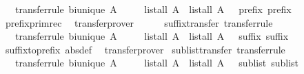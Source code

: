 \begin{isabellebody}
\ \ \ {\isacharbrackleft}transfer{\isacharunderscore}rule{\isacharbrackright}{\isacharcolon}\ {\isachardoublequoteopen}bi{\isacharunderscore}unique\ A{\isachardoublequoteclose}\isanewline
\ \ \ \ \ {\isachardoublequoteopen}{\isacharparenleft}list{\isacharunderscore}all{}\ A\ {\isacharequal}{\isacharequal}{\isacharequal}{\isachargreater}\ list{\isacharunderscore}all{}\ A\ {\isacharequal}{\isacharequal}{\isacharequal}{\isachargreater}\ {\isacharparenleft}{\isacharequal}{\isacharparenright}{\isacharparenright}\ prefix\ prefix{\isachardoublequoteclose}\ \ \isanewline
%
\isadelimproof
\ \ %
\endisadelimproof
%
\isatagproof
{}\isamarkupfalse%
\ prefix{\isacharunderscore}primrec\ \isamarkupfalse%
\ transfer{\isacharunderscore}prover%
\endisatagproof
{\isafoldproof}%
%
\isadelimproof
\isanewline
%
\endisadelimproof
\ \ \ \ \isanewline
{}\isamarkupfalse%
\ suffix{\isacharunderscore}transfer\ {\isacharbrackleft}transfer{\isacharunderscore}rule{\isacharbrackright}{\isacharcolon}\isanewline
\ \ \ {\isacharbrackleft}transfer{\isacharunderscore}rule{\isacharbrackright}{\isacharcolon}\ {\isachardoublequoteopen}bi{\isacharunderscore}unique\ A{\isachardoublequoteclose}\isanewline
\ \ \ \ \ {\isachardoublequoteopen}{\isacharparenleft}list{\isacharunderscore}all{}\ A\ {\isacharequal}{\isacharequal}{\isacharequal}{\isachargreater}\ list{\isacharunderscore}all{}\ A\ {\isacharequal}{\isacharequal}{\isacharequal}{\isachargreater}\ {\isacharparenleft}{\isacharequal}{\isacharparenright}{\isacharparenright}\ suffix\ suffix{\isachardoublequoteclose}\ \ \isanewline
%
\isadelimproof
\ \ %
\endisadelimproof
%
\isatagproof
{}\isamarkupfalse%
\ suffix{\isacharunderscore}to{\isacharunderscore}prefix\ {\isacharbrackleft}abs{\isacharunderscore}def{\isacharbrackright}\ \isamarkupfalse%
\ transfer{\isacharunderscore}prover%
\endisatagproof
{\isafoldproof}%
%
\isadelimproof
\isanewline
%
\endisadelimproof
\isanewline
{}\isamarkupfalse%
\ sublist{\isacharunderscore}transfer\ {\isacharbrackleft}transfer{\isacharunderscore}rule{\isacharbrackright}{\isacharcolon}\isanewline
\ \ \ {\isacharbrackleft}transfer{\isacharunderscore}rule{\isacharbrackright}{\isacharcolon}\ {\isachardoublequoteopen}bi{\isacharunderscore}unique\ A{\isachardoublequoteclose}\isanewline
\ \ \ \ \ {\isachardoublequoteopen}{\isacharparenleft}list{\isacharunderscore}all{}\ A\ {\isacharequal}{\isacharequal}{\isacharequal}{\isachargreater}\ list{\isacharunderscore}all{}\ A\ {\isacharequal}{\isacharequal}{\isacharequal}{\isachargreater}\ {\isacharparenleft}{\isacharequal}{\isacharparenright}{\isacharparenright}\ sublist\ sublist{\isachardoublequoteclose}\isanewline

\end{isabellebody}
